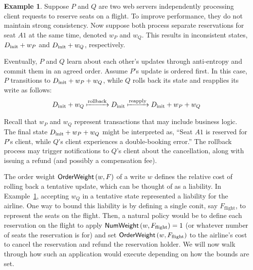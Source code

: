 \documentclass[]             %
{NASA}                       %
\theoremstyle{definition}
\newtheorem{example}[theorem]{Example}
\begin{document}

\begin{example}
  \label{ex:conit-booking}
  Suppose $P$ and $Q$ are two web servers independently processing
  client requests to reserve seats on a flight. To improve performance,
  they do not maintain strong consistency. Now suppose both process
  separate reservations for seat $A1$ at the same time, denoted $w_P$
  and $w_Q$. This results in inconsistent states, $D_\textrm{init} + w_P$ and
  $D_\textrm{init} + w_Q$, respectively.

  Eventually, $P$ and $Q$ learn about each other's updates through
  anti-entropy and commit them in an agreed order. Assume $P$'s update
  is ordered first. In this case, $P$ transitions to
  $D_\textrm{init} + w_P + w_Q$, while $Q$ rolls back its state and reapplies
  its write as follows:
  \begin{equation*}
    D_\textrm{init} + w_Q \xmapsto{\textrm{rollback}} D_\textrm{init} \xmapsto{\textrm{reapply}} D_\textrm{init} + w_P +
    w_Q
  \end{equation*}

  Recall that $w_P$ and $w_Q$ represent transactions that may include
  business logic. The final state $D_\textrm{init} + w_P + w_Q$ might be
  interpreted as, ``Seat $A1$ is reserved for $P$'s client, while
  $Q$'s client experiences a double-booking error.''  The rollback
  process may trigger notifications to $Q$'s client about the
  cancellation, along with issuing a refund (and possibly a
  compensation fee).
\end{example}


The order weight $\mathsf{OrderWeight}\left(w, F\right)$ of a write $w$
defines the relative cost of rolling back a tentative update, which
can be thought of as a liability. In Example~\ref{ex:conit-booking},
accepting $w_Q$ in a tentative state represented a liability for the
airline. One way to bound this liability is by defining a single
conit, say $F_{\textrm{flight}}$, to represent the seats on the
flight. Then, a natural policy would be to define each reservation on
the flight to apply $\mathsf{NumWeight}\left(w,F_{\textrm{flight}}\right) = 1$
(or whatever number of seats the reservation is for) and set
$\mathsf{OrderWeight}\left(w,F_{\textrm{flight}}\right)$ to the airline's cost
to cancel the reservation and refund the reservation holder. We will
now walk through how such an application would execute depending on
how the bounds are set.
\end{document}
